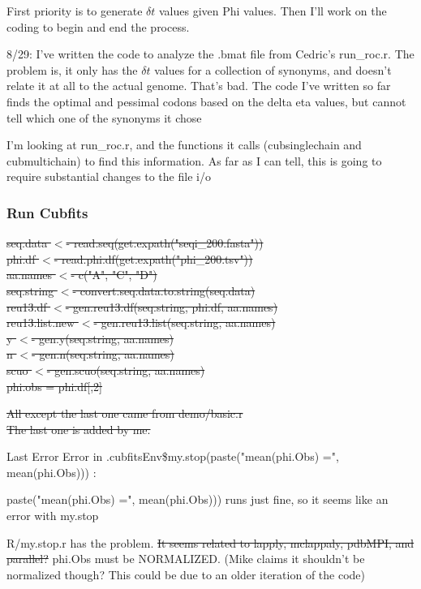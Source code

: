 \documentclass[11pt]{article} %
\begin{document}
First priority is to generate $\delta t$ values given Phi values. Then I'll work on the coding to begin and end the process.

8/29: I've written the code to analyze the .bmat file from Cedric's run\_roc.r. The problem is, it only has the $\delta t$ values for a collection of synonyms, and doesn't relate it at all to the actual genome. That's bad. The code I've written so far finds the optimal and pessimal codons based on the delta eta values, but cannot tell which one of the synonyms it chose

I'm looking at run\_roc.r, and the functions it calls (cubsinglechain and cubmultichain) to find this information. As far as I can tell, this is going to require substantial changes to the file i/o

\subsubsection{Run Cubfits}

\sout{seq.data $<$- read.seq(get.expath("seqi\_200.fasta"))\\
phi.df $<$- read.phi.df(get.expath("phi\_200.tsv"))\\
aa.names $<$- c("A", "C", "D")\\
seq.string $<$- convert.seq.data.to.string(seq.data)\\
reu13.df $<$- gen.reu13.df(seq.string, phi.df, aa.names)\\
reu13.list.new $<$- gen.reu13.list(seq.string, aa.names)\\
y $<$- gen.y(seq.string, aa.names)\\
n $<$- gen.n(seq.string, aa.names)\\
scuo $<$- gen.scuo(seq.string, aa.names) \\
phi.obs = phi.df[,2]}

\sout{All except the last one came from demo/basic.r\\The last one is added by me.}


Last Error
Error in .cubfitsEnv\$my.stop(paste("mean(phi.Obs) =", mean(phi.Obs))) : 

paste("mean(phi.Obs) =", mean(phi.Obs))) runs just fine, so it seems like an error with my.stop


R/my.stop.r has the problem. \sout{It seems related to lapply, mclappaly, pdbMPI, and parallel?} phi.Obs must be NORMALIZED. (Mike claims it shouldn't be normalized though? This could be due to an older iteration of the code)
\end{document}
